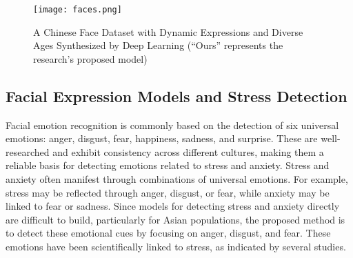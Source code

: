 \begin{figure}[ht]
    \centering
    \captionsetup{justification=centering}
    \texttt{[image: faces.png]}
    \caption{A Chinese Face Dataset with Dynamic Expressions and Diverse Ages Synthesized by Deep Learning (“Ours” represents the research’s proposed model)}
    \label{fig:faces}
\end{figure}
\subsection{Facial Expression Models and Stress Detection}
Facial emotion recognition is commonly based on the detection of six universal emotions: anger, disgust, fear, happiness, sadness, and surprise. These are well-researched and exhibit consistency across different cultures, making them a reliable basis for detecting emotions related to stress and anxiety. Stress and anxiety often manifest through combinations of universal emotions. For example, stress may be reflected through anger, disgust, or fear, while anxiety may be linked to fear or sadness.
Since models for detecting stress and anxiety directly are difficult to build, particularly for Asian populations, the proposed method is to detect these emotional cues by focusing on anger, disgust, and fear\cite{iceis21}. These emotions have been scientifically linked to stress, as indicated by several studies. 
